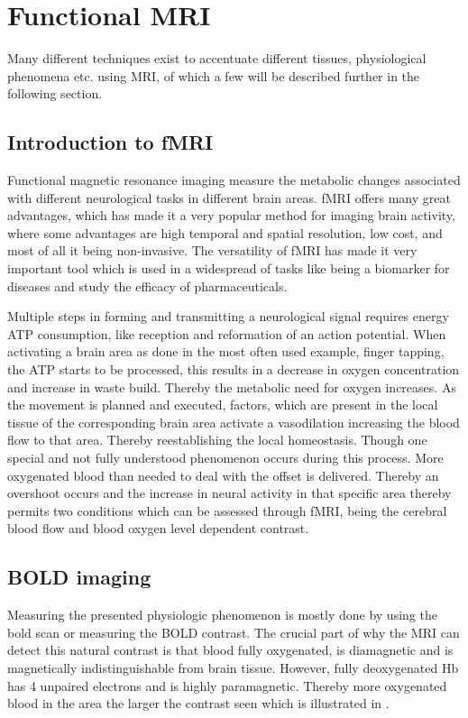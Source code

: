 \section{Functional MRI}

Many different techniques exist to accentuate different tissues, physiological phenomena etc. using MRI, of which a few will be described further in the following section. 

\subsection{Introduction to fMRI}
Functional magnetic resonance imaging measure the metabolic changes associated with different neurological tasks in different brain areas. fMRI offers many great advantages, which has made it a very popular method for imaging brain activity, where some advantages are high temporal and spatial resolution, low cost, and most of all it being non-invasive. The versatility of fMRI has made it very important tool which is used in a widespread of tasks like being a biomarker for diseases and study the efficacy of pharmaceuticals.\cite{Glover2011}

Multiple steps in forming and transmitting a neurological signal requires energy ATP consumption, like reception and reformation of an action potential. When activating a brain area as done in the most often used example, finger tapping, the ATP starts to be processed, this results in a decrease in oxygen concentration and increase in waste build. Thereby the metabolic need for oxygen increases. As the movement is planned and executed, factors, which are present in the local tissue of the corresponding brain area activate a vasodilation increasing the blood flow to that area. Thereby reestablishing the local homeostasis. Though one special and not fully understood phenomenon occurs during this process. More oxygenated blood than needed to deal with the offset is delivered. Thereby an overshoot occurs and the increase in neural activity in that specific area thereby permits two conditions which can be assessed through fMRI, being the cerebral blood flow and blood oxygen level dependent contrast.\cite{Glover2011,Poldrack2011}

\subsection{BOLD imaging}

Measuring the presented physiologic phenomenon is mostly done by using the bold scan or measuring the BOLD contrast. The crucial part of why the MRI can detect this natural contrast is that blood fully oxygenated, is diamagnetic and is magnetically indistinguishable from brain tissue. However, fully deoxygenated Hb has 4 unpaired electrons and is highly paramagnetic.
Thereby more oxygenated blood in the area the larger the contrast seen which is illustrated in . \cite{Glover2011,Khanna2015,Poldrack2011}

